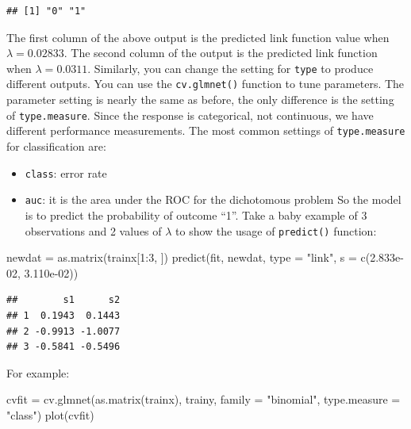 \documentclass[
  12pt,
]{krantz}
\makeatletter
\newenvironment{Shaded}{\begin{snugshade}}{\end{snugshade}}
\newcommand{\AttributeTok}[1]{\textcolor[rgb]{0.61,0.61,0.61}{#1}}
\newcommand{\DecValTok}[1]{\textcolor[rgb]{0.06,0.06,0.06}{#1}}
\newcommand{\FloatTok}[1]{\textcolor[rgb]{0.06,0.06,0.06}{#1}}
\newcommand{\FunctionTok}[1]{\textcolor[rgb]{0,0,0}{#1}}
\newcommand{\NormalTok}[1]{#1}
\newcommand{\OtherTok}[1]{\textcolor[rgb]{0.37,0.37,0.37}{#1}}
\newcommand{\SpecialCharTok}[1]{\textcolor[rgb]{0,0,0}{#1}}
\newcommand{\StringTok}[1]{\textcolor[rgb]{0.5,0.5,0.5}{#1}}
\providecommand{\tightlist}{%
  \setlength{\itemsep}{0pt}\setlength{\parskip}{0pt}}
\newenvironment{kframe}{%
\medskip{}
\setlength{\fboxsep}{.8em}
 \def\at@end@of@kframe{}%
 \ifinner\ifhmode%
  \def\at@end@of@kframe{\end{minipage}}%
  \begin{minipage}{\columnwidth}%
 \fi\fi%
 \def\FrameCommand##1{\hskip\@totalleftmargin \hskip-\fboxsep
 \colorbox{shadecolor}{##1}\hskip-\fboxsep
     \hskip-\linewidth \hskip-\@totalleftmargin \hskip\columnwidth}%
 \MakeFramed {\advance\hsize-\width
   \@totalleftmargin\z@ \linewidth\hsize
   \@setminipage}}%
 {\par\unskip\endMakeFramed%
 \at@end@of@kframe}
\renewenvironment{Shaded}{\begin{kframe}}{\end{kframe}}
\makeatother
\begin{document}
\begin{verbatim}
## [1] "0" "1"
\end{verbatim}

The first column of the above output is the predicted link function value when \(\lambda=0.02833\). The second column of the output is the predicted link function when \(\lambda=0.0311\). Similarly, you can change the setting for \texttt{type} to produce different outputs. You can use the \texttt{cv.glmnet()} function to tune parameters. The parameter setting is nearly the same as before, the only difference is the setting of \texttt{type.measure}. Since the response is categorical, not continuous, we have different performance measurements. The most common settings of \texttt{type.measure} for classification are:

\begin{itemize}
\tightlist
\item
  \texttt{class}: error rate
\item
  \texttt{auc}: it is the area under the ROC for the dichotomous problem
  So the model is to predict the probability of outcome ``1''. Take a baby example of 3 observations and 2 values of \(\lambda\) to show the usage of \texttt{predict()} function:
\end{itemize}

\begin{Shaded}
\begin{Highlighting}[]
\NormalTok{newdat }\OtherTok{=} \FunctionTok{as.matrix}\NormalTok{(trainx[}\DecValTok{1}\SpecialCharTok{:}\DecValTok{3}\NormalTok{, ])}
\FunctionTok{predict}\NormalTok{(fit, newdat, }\AttributeTok{type =} \StringTok{"link"}\NormalTok{, }\AttributeTok{s =} \FunctionTok{c}\NormalTok{(}\FloatTok{2.833e{-}02}\NormalTok{, }\FloatTok{3.110e{-}02}\NormalTok{))}
\end{Highlighting}
\end{Shaded}

\begin{verbatim}
##        s1      s2
## 1  0.1943  0.1443
## 2 -0.9913 -1.0077
## 3 -0.5841 -0.5496
\end{verbatim}

For example:

\begin{Shaded}
\begin{Highlighting}[]
\NormalTok{cvfit }\OtherTok{=} \FunctionTok{cv.glmnet}\NormalTok{(}\FunctionTok{as.matrix}\NormalTok{(trainx), trainy, }
                  \AttributeTok{family =} \StringTok{"binomial"}\NormalTok{, }\AttributeTok{type.measure =} \StringTok{"class"}\NormalTok{)}
\FunctionTok{plot}\NormalTok{(cvfit)}
\end{Highlighting}
\end{Shaded}
\end{document}
